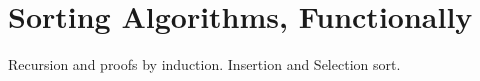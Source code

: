 
\section{Sorting Algorithms, Functionally}
Recursion and proofs by induction. Insertion and Selection sort.
